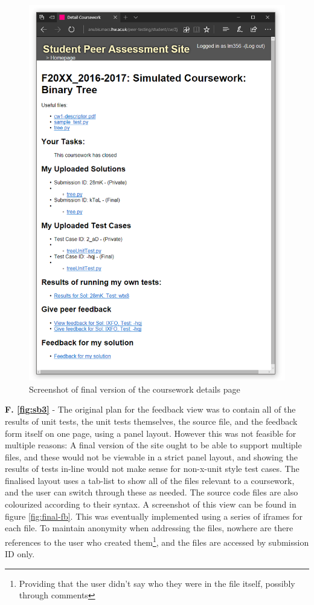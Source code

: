 \documentclass[a4paper,11pt]{report}
\begin{document}
\begin{figure}
\centering
\includegraphics[height=0.8\textheight]{storyboard/Final-cw.png}
\caption{\label{fig:final-cw}Screenshot of final version of the coursework details page}
\end{figure}
\textbf{F. \ref{fig:sb3}} - The original plan for the feedback view was to contain all of the results of unit tests, the unit tests themselves, the source file, and the feedback form itself on one page, using a panel layout. However this was not feasible for multiple reasons: A final version of the site ought to be able to support multiple files, and these would not be viewable in a strict panel layout, and showing the results of tests in-line would not make sense for non-x-unit style test cases. The finalised layout uses a tab-list to show all of the files relevant to a coursework, and the user can switch through these as needed. The source code files are also colourized according to their syntax. A screenshot of this view can be found in figure \ref{fig:final-fb}. This was eventually implemented using a series of iframes for each file. To maintain anonymity when addressing the files, nowhere are there references to the user who created them\footnote{Providing that the user didn't say who they were in the file itself, possibly through comments}, and the files are accessed by submission ID only.\par
\end{document}
